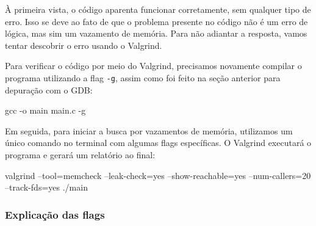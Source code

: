 À primeira vista, o código aparenta funcionar corretamente, sem qualquer tipo de erro. Isso se deve ao fato de que o 
problema presente no código não é um erro de lógica, mas sim um vazamento de memória. Para não adiantar a resposta, 
vamos tentar descobrir o erro usando o Valgrind.

Para verificar o código por meio do Valgrind, precisamos novamente compilar o programa utilizando a flag \texttt{-g}, 
assim como foi feito na seção anterior para depuração com o GDB:

\begin{exterminal}
    gcc -o main main.c -g
\end{exterminal}

Em seguida, para iniciar a busca por vazamentos de memória, utilizamos um único comando no terminal com algumas flags 
específicas. O Valgrind executará o programa e gerará um relatório ao final:

\begin{exterminal}
    valgrind --tool=memcheck --leak-check=yes --show-reachable=yes --num-callers=20 --track-fds=yes ./main
\end{exterminal}

\subsubsection{Explicação das flags}

